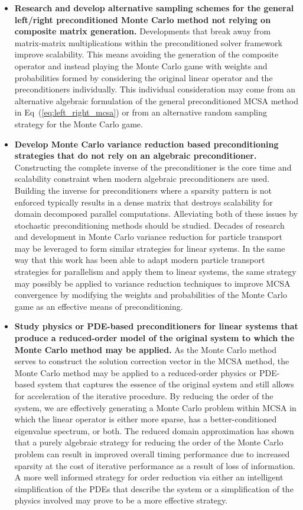 \begin{itemize}
\item \textbf{Research and develop alternative sampling schemes for
  the general left/right preconditioned Monte Carlo method not relying
  on composite matrix generation.} Developments that break away from
  matrix-matrix multiplications within the preconditioned solver
  framework improve scalability. This means avoiding the generation of
  the composite operator and instead playing the Monte Carlo game with
  weights and probabilities formed by considering the original linear
  operator and the preconditioners individually. This individual
  consideration may come from an alternative algebraic formulation of
  the general preconditioned MCSA method in
  Eq~(\ref{eq:left_right_mcsa}) or from an alternative random sampling
  strategy for the Monte Carlo game.
\item \textbf{Develop Monte Carlo variance reduction based
  preconditioning strategies that do not rely on an algebraic
  preconditioner.}  Constructing the complete inverse of the
  preconditioner is the core time and scalability constraint when
  modern algebraic preconditioners are used. Building the inverse for
  preconditioners where a sparsity pattern is not enforced typically
  results in a dense matrix that destroys scalability for domain
  decomposed parallel computations. Alleviating both of these issues
  by stochastic preconditioning methods should be studied. Decades of
  research and development in Monte Carlo variance reduction for
  particle transport \cite{booth_1994} may be leveraged to form
  similar strategies for linear systems. In the same way that this
  work has been able to adapt modern particle transport strategies for
  parallelism and apply them to linear systems, the same strategy may
  possibly be applied to variance reduction techniques to improve MCSA
  convergence by modifying the weights and probabilities of the Monte
  Carlo game as an effective means of preconditioning.
\item \textbf{Study physics or PDE-based preconditioners for linear
  systems that produce a reduced-order model of the original system to
  which the Monte Carlo method may be applied.} As the Monte Carlo
  method serves to construct the solution correction vector in the
  MCSA method, the Monte Carlo method may be applied to a
  reduced-order physics or PDE-based system that captures the essence
  of the original system and still allows for acceleration of the
  iterative procedure. By reducing the order of the system, we are
  effectively generating a Monte Carlo problem within MCSA in which
  the linear operator is either more sparse, has a better-conditioned
  eigenvalue spectrum, or both. The reduced domain approximation has
  shown that a purely algebraic strategy for reducing the order of the
  Monte Carlo problem can result in improved overall timing
  performance due to increased sparsity at the cost of iterative
  performance as a result of loss of information. A more well informed
  strategy for order reduction via either an intelligent
  simplification of the PDEs that describe the system or a
  simplification of the physics involved may prove to be a more
  effective strategy.
\end{itemize}

